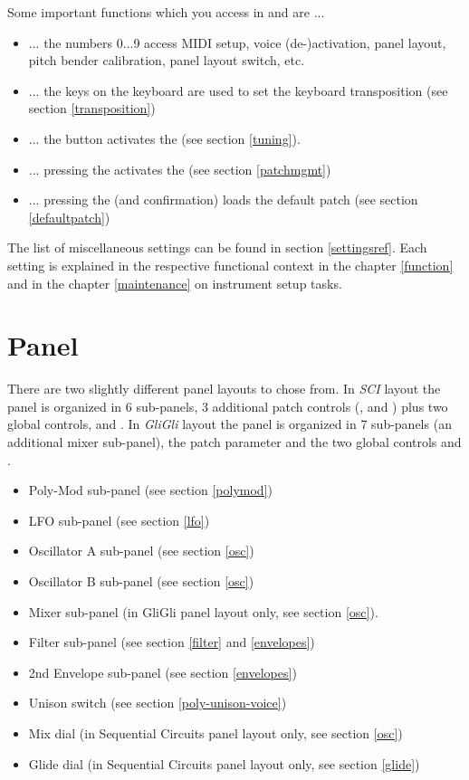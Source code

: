 \documentclass[landscape, 11pt, oneside]{report}
\newenvironment{flowtext}{\addmargin[0cm]{7cm}}{\endaddmargin} %
\begin{document}
\begin{flowtext}
Some important functions which you access in \shiftmode and \shiftlock are ...
\begin{itemize}
  \item ... the numbers 0...9 access MIDI setup, voice (de-)activation, panel layout, pitch bender calibration, panel layout switch, etc. 
  \item ... the keys on the keyboard are used to set the keyboard transposition (see section \ref{transposition}) 
  \item ... the \tune button activates the \pernote  (see section \ref{tuning}).
  \item ... pressing the \record activates the \patchmgmt (see section \ref{patchmgmt})
  \item ... pressing the \preset (and confirmation) loads the default patch (see section \ref{defaultpatch})
\end{itemize}

The list of miscellaneous settings can be found in section \ref{settingsref}. Each setting is explained in the respective functional context in the chapter \ref{function} and in the chapter \ref{maintenance} on instrument setup tasks.

\section{Panel}\label{panel}

There are two slightly different panel layouts to chose from. In \textit{SCI} layout the panel is organized in 6 sub-panels, 3 additional patch controls (\unison, \mixer and \glidepot) plus two global controls, \mastertune and \mastervol. In \textit{GliGli} layout the panel is organized in 7 sub-panels (an additional mixer sub-panel), the patch parameter \unison and the two global controls \mastertune and \mastervol. 

\begin{itemize}
  \item Poly-Mod sub-panel (see section \ref{polymod})
  \item LFO sub-panel (see section \ref{lfo})
  \item Oscillator A sub-panel (see section \ref{osc})
  \item Oscillator B sub-panel (see section \ref{osc})
  \item Mixer sub-panel (in GliGli panel layout only, see section \ref{osc}).  
  \item Filter sub-panel (see section \ref{filter} and \ref{envelopes}) 
  \item 2nd Envelope sub-panel (see section \ref{envelopes})
  \item Unison switch (see section \ref{poly-unison-voice})
  \item Mix dial (in Sequential Circuits panel layout only, see section \ref{osc})
  \item Glide dial (in Sequential Circuits panel layout only, see section \ref{glide})
\end{itemize}


\end{flowtext}
\end{document}
